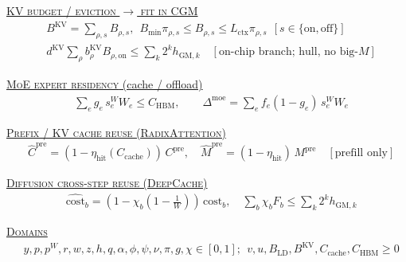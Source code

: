 \begin{landscape}
\begin{center}
{\begin{minipage}{0.965\linewidth}
\begin{minipage}[t]{0.485\linewidth}
\underline{\textsc{KV budget / eviction $\to$ fit in CGM} \citep{xiao2024streamingllm,zhang2023h2o}}
\vspace{-2pt}
\begin{align*}
&B^{\mathrm{KV}}=\textstyle\sum_{\rho,s}B_{\rho,s},\ \ B_{\min}\pi_{\rho,s}\le B_{\rho,s}\le L_{\mathrm{ctx}}\pi_{\rho,s}\ \ [s\in\{\mathrm{on},\mathrm{off}\}]\\[-1pt]
&d^{\mathrm{KV}}\textstyle\sum_\rho b^{\mathrm{KV}}_\rho B_{\rho,\mathrm{on}}\le\sum_k 2^k h_{\mathrm{GM},k}\quad[\text{on-chip branch; hull, no big-}M]
\end{align*}
\vspace{-8pt}

\underline{\textsc{MoE expert residency} (cache / offload)}
\vspace{-2pt}
\begin{align*}
&\textstyle\sum_e g_e\,s^{W}_e W_e\le C_{\mathrm{HBM}},\qquad
 \Delta^{\mathrm{moe}}=\sum_e f_e(1-g_e)\,s^{W}_e W_e
\end{align*}
\vspace{-8pt}

\underline{\textsc{Prefix / KV cache reuse (RadixAttention)} \citep{zheng2024sglang}}
\vspace{-2pt}
\begin{align*}
&\widehat C^{\mathrm{pre}}=(1-\eta_{\mathrm{hit}}(C_{\mathrm{cache}}))\,C^{\mathrm{pre}},\quad
 \widehat M^{\mathrm{pre}}=(1-\eta_{\mathrm{hit}})\,M^{\mathrm{pre}}\quad[\text{prefill only}]
\end{align*}
\vspace{-8pt}

\underline{\textsc{Diffusion cross-step reuse (DeepCache)} \citep{ma2024deepcache}}
\vspace{-2pt}
\begin{align*}
&\widehat{\mathrm{cost}}_b=(1-\chi_b(1-\tfrac1W))\,\mathrm{cost}_b,\quad \textstyle\sum_b\chi_b F_b\le\sum_k 2^k h_{\mathrm{GM},k}
\end{align*}
\vspace{-8pt}

\underline{\textsc{Domains}}
\vspace{-2pt}
\begin{align*}
&y,p,p^W,r,w,z,h,q,\alpha,\phi,\psi,\nu,\pi,g,\chi\in[0,1];\ \ v,u,B_{\mathrm{LD}},B^{\mathrm{KV}},C_{\mathrm{cache}},C_{\mathrm{HBM}}\ge 0
\end{align*}
\end{minipage}

\vspace{2pt}
\end{minipage}}
\end{center}


\end{landscape}
